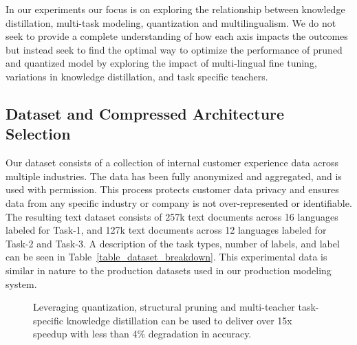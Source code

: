In our experiments our focus is on exploring the relationship between knowledge distillation, multi-task modeling, quantization and multilingualism. 
We do not seek to provide a complete understanding of how each axis impacts the outcomes but instead seek to find the optimal way to optimize the performance of pruned and quantized model by exploring the impact of multi-lingual fine tuning, variations in knowledge distillation, and task specific teachers.

\subsection{Dataset and Compressed Architecture Selection}
Our dataset consists of a collection of internal customer experience data across multiple industries.
The data has been fully anonymized and aggregated, and is used with permission.
This process protects customer data privacy and ensures data from any specific industry or company is not over-represented or identifiable.
The resulting text dataset consists of 257k text documents across 16 languages labeled for Task-1, and 127k text documents across 12 languages labeled for Task-2 and Task-3.
A description of the task types, number of labels, and label can be seen in Table~\ref{table_dataset_breakdown}.
This experimental data is similar in nature to the production datasets used in our production modeling system.
\begin{figure}[!htb]
    \centering
    \caption{Leveraging quantization, structural pruning and multi-teacher task-specific knowledge distillation can be used to deliver over 15x speedup with less than 4\% degradation in accuracy.}
    \label{fig:multi-classification}
\end{figure}
